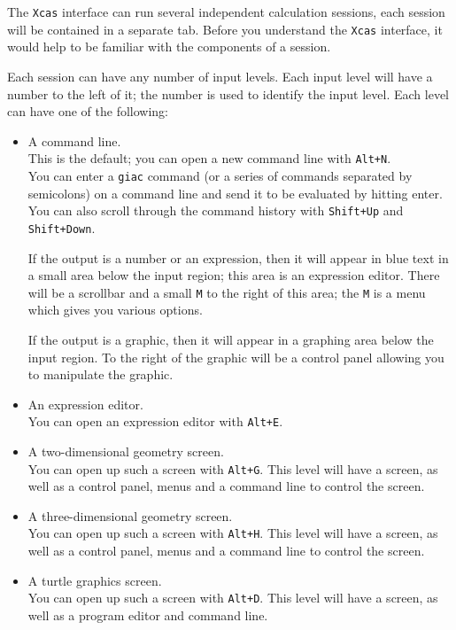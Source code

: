 \documentclass[a4paper,11pt]{book}
\begin{document}
The \texttt{Xcas} interface can run several independent calculation
sessions, each session will be contained in a separate tab.  Before
you understand the \texttt{Xcas} interface, it would help to be
familiar with the components of a session.

Each session can have any number of input levels.  Each input level
will have a number to the left of it; the number is used to identify
the input level.  Each level can have one of the following:
\begin{itemize}
  \item A command line.\\
  This is the default; you can open a new
  command line with \texttt{Alt+N}.\\
  You can enter a \texttt{giac} command (or a series of commands
  separated by semicolons) on a command line and send it to be
  evaluated by hitting enter.  You can also scroll through the command
  history with \texttt{Shift+Up} and \texttt{Shift+Down}.
  
  If the output is a number or an expression, then it will appear in
  blue text in a small area below the input region; this area is an
  expression editor.  There will be a scrollbar and a small \texttt{M}
  to the right of this area; the \texttt{M} is a menu which gives you
  various options.

  If the output is a graphic, then it will appear in a graphing area
  below the input region.  To the right of the graphic will be a
  control panel allowing you to manipulate the graphic.

  \item  An expression editor.\\  
  You can open an expression editor with
  \texttt{Alt+E}.
  
  \item A two-dimensional geometry screen.\\
  You can open up such a
  screen with \texttt{Alt+G}.
  This level will have a screen, as well as a control panel, menus and a
  command line to control the screen.
  
  \item A three-dimensional geometry screen.\\
  You can open up such a
  screen with \texttt{Alt+H}.
  This level will have a screen, as well as a control panel, menus and
  a command line to control the screen.
  
  \item A turtle graphics screen.\\
  You can open up such a screen with
  \texttt{Alt+D}.
  This level will have a screen, as well as a program editor and
  command line.
  

\end{itemize}
\end{document}
